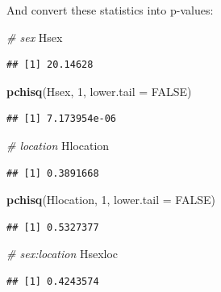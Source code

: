\documentclass[
  12pt,
]{book}
\newenvironment{Shaded}{\begin{snugshade}}{\end{snugshade}}
\newcommand{\CommentTok}[1]{\textcolor[rgb]{0.56,0.35,0.01}{\textit{#1}}}
\newcommand{\DataTypeTok}[1]{\textcolor[rgb]{0.13,0.29,0.53}{#1}}
\newcommand{\DecValTok}[1]{\textcolor[rgb]{0.00,0.00,0.81}{#1}}
\newcommand{\KeywordTok}[1]{\textcolor[rgb]{0.13,0.29,0.53}{\textbf{#1}}}
\newcommand{\NormalTok}[1]{#1}
\newcommand{\OtherTok}[1]{\textcolor[rgb]{0.56,0.35,0.01}{#1}}
\begin{document}
And convert these statistics into p-values:

\begin{Shaded}
\begin{Highlighting}[]
\CommentTok{\# sex}
\NormalTok{Hsex}
\end{Highlighting}
\end{Shaded}

\begin{verbatim}
## [1] 20.14628
\end{verbatim}

\begin{Shaded}
\begin{Highlighting}[]
\KeywordTok{pchisq}\NormalTok{(Hsex, }\DecValTok{1}\NormalTok{, }\DataTypeTok{lower.tail =} \OtherTok{FALSE}\NormalTok{)}
\end{Highlighting}
\end{Shaded}

\begin{verbatim}
## [1] 7.173954e-06
\end{verbatim}

\begin{Shaded}
\begin{Highlighting}[]
\CommentTok{\# location}
\NormalTok{Hlocation}
\end{Highlighting}
\end{Shaded}

\begin{verbatim}
## [1] 0.3891668
\end{verbatim}

\begin{Shaded}
\begin{Highlighting}[]
\KeywordTok{pchisq}\NormalTok{(Hlocation, }\DecValTok{1}\NormalTok{, }\DataTypeTok{lower.tail =} \OtherTok{FALSE}\NormalTok{)}
\end{Highlighting}
\end{Shaded}

\begin{verbatim}
## [1] 0.5327377
\end{verbatim}

\begin{Shaded}
\begin{Highlighting}[]
\CommentTok{\# sex:location}
\NormalTok{Hsexloc}
\end{Highlighting}
\end{Shaded}

\begin{verbatim}
## [1] 0.4243574
\end{verbatim}
\end{document}
